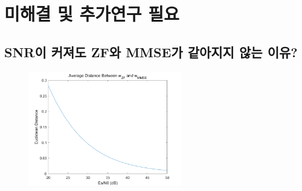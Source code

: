\documentclass{article}
\begin{document}
\section{미해결 및 추가연구 필요}
\subsection{SNR이 커져도 ZF와 MMSE가 같아지지 않는 이유?}
\begin{figure}[H]
	\centering
	\includegraphics[width=0.6\textwidth]{distance.png}
	\caption{}
\end{figure}
\end{document}
